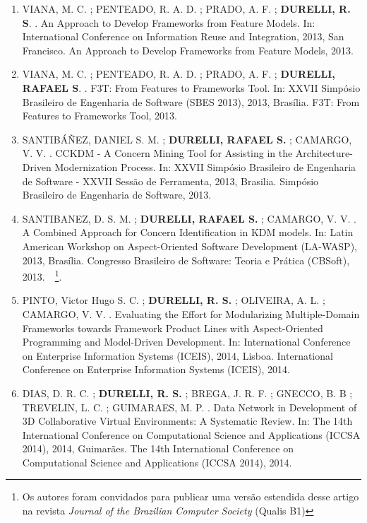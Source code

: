 \documentclass[12pt]{article}
\begin{document}
\begin{itemize}
\begin{enumerate}
		\item VIANA, M. C. ; PENTEADO, R. A. D. ; PRADO, A. F. ; \textbf{DURELLI, R. S}. . An Approach to Develop Frameworks from Feature Models. In: International Conference on Information Reuse and Integration, 2013, San Francisco. An Approach to Develop Frameworks from Feature Models, 2013.
		
		\item VIANA, M. C. ; PENTEADO, R. A. D. ; PRADO, A. F. ; \textbf{DURELLI, RAFAEL S}. . F3T: From Features to Frameworks Tool. In: XXVII Simpósio Brasileiro de Engenharia de Software (SBES 2013), 2013, Brasília. F3T: From Features to Frameworks Tool, 2013.
		
		\item SANTIBÁÑEZ, DANIEL S. M. ; \textbf{DURELLI, RAFAEL S.} ; CAMARGO, V. V. . CCKDM - A Concern Mining Tool for Assisting in the Architecture-Driven Modernization Process. In: XXVII Simpósio Brasileiro de Engenharia de Software - XXVII Sessão de Ferramenta, 2013, Brasilia. Simpósio Brasileiro de Engenharia de Software, 2013.
		
		\item SANTIBANEZ, D. S. M. ; \textbf{DURELLI, RAFAEL S.} ; CAMARGO, V. V. . A Combined Approach for Concern Identification in KDM models. In: Latin American Workshop on Aspect-Oriented Software Development (LA-WASP), 2013, Brasília. Congresso Brasileiro de Software: Teoria e Prática (CBSoft), 2013.~~\footnote{Os autores foram convidados para publicar uma versão estendida desse artigo na revista \textit{Journal of the Brazilian Computer Society} (Qualis B1)}.
		
		\item PINTO, Victor Hugo S. C. ; \textbf{DURELLI, R. S.} ; OLIVEIRA, A. L. ; CAMARGO, V. V. . Evaluating the Effort for Modularizing Multiple-Domain Frameworks towards Framework Product Lines with Aspect-Oriented Programming and Model-Driven Development. In: International Conference on Enterprise Information Systems (ICEIS), 2014, Lisboa. International Conference on Enterprise Information Systems (ICEIS), 2014.
		
		\item DIAS, D. R. C. ; \textbf{DURELLI, R. S.} ; BREGA, J. R. F. ; GNECCO, B. B ; TREVELIN, L. C. ; GUIMARAES, M. P. . Data Network in Development of 3D Collaborative Virtual Environments: A Systematic Review. In: The 14th International Conference on Computational Science and Applications (ICCSA 2014), 2014, Guimarães. The 14th International Conference on Computational Science and Applications (ICCSA 2014), 2014.
		

\end{enumerate}
\end{itemize}
\end{document}
